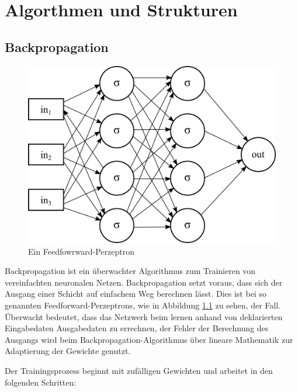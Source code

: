 \chapter{Algorthmen und Strukturen}
\label{cha:algorithmen}


\section{Backpropagation}

\begin{figure}
	\centering
	\includegraphics[scale=1]{images/net-for-bp.png}
	\caption{Ein Feedfowrward-Perzeptron}
	\label{fig:net-for-bp}
\end{figure}

Backpropagation ist ein überwachter Algorithmus zum Trainieren von vereinfachten neuronalen Netzen. Backpropagation setzt voraus, dass sich der Ausgang einer Schicht auf einfachem Weg berechnen lässt. Dies ist bei so genannten Feedforward-Perzeptrons, wie in Abbildung \ref{fig:net-for-bp} zu sehen, der Fall. Überwacht bedeutet, dass das Netzwerk beim lernen anhand von deklarierten Eingabedaten Ausgabedaten zu errechnen, der Fehler der Berechnung des Ausgangs wird beim Backpropagation-Algorithmus über lineare Mathematik zur Adaptierung der Gewichte genutzt.

Der Trainingsprozess beginnt mit zufälligen Gewichten und arbeitet in den folgenden Schritten:

